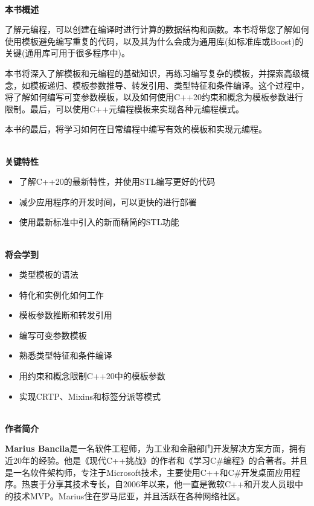 \documentclass[11pt,a4paper,UTF8]{book}
\begin{document}
\begin{sloppypar}
		\hspace*{\fill} \\ %
		\noindent\textbf{本书概述}
		
		了解元编程，可以创建在编译时进行计算的数据结构和函数。本书将带您了解如何使用模板避免编写重复的代码，以及其为什么会成为通用库(如标准库或Boost)的关键(通用库可用于很多程序中)。
		
		本书将深入了解模板和元编程的基础知识，再练习编写复杂的模板，并探索高级概念，如模板递归、模板参数推导、转发引用、类型特征和条件编译。这个过程中，将了解如何编写可变参数模板，以及如何使用C++20约束和概念为模板参数进行限制。最后，可以使用C++元编程模板来实现各种元编程模式。
		
		本书的最后，将学习如何在日常编程中编写有效的模板和实现元编程。
		
		\hspace*{\fill} \\ %
		\noindent\textbf{关键特性}
		\begin{itemize}
			\item 了解C++20的最新特性，并使用STL编写更好的代码
			\item 减少应用程序的开发时间，可以更快的进行部署
			\item 使用最新标准中引入的新而精简的STL功能
		\end{itemize}
		
		\hspace*{\fill} \\ %
		\noindent\textbf{将会学到}
		\begin{itemize}
			\item 类型模板的语法
			\item 特化和实例化如何工作
			\item 模板参数推断和转发引用
			\item 编写可变参数模板
			\item 熟悉类型特征和条件编译
			\item 用约束和概念限制C++20中的模板参数
			\item 实现CRTP、Mixins和标签分派等模式
		\end{itemize}
		
		\hspace*{\fill} \\ %
		\noindent\textbf{作者简介}
		
		\textbf{Marius Bancila}是一名软件工程师，为工业和金融部门开发解决方案方面，拥有近20年的经验。他是《现代C++挑战》的作者和《学习C\#编程》的合著者。并且是一名软件架构师，专注于Microsoft技术，主要使用C++和C\#开发桌面应用程序。热衷于分享其技术专长，自2006年以来，他一直是微软C++和开发人员眼中的技术MVP。Marius住在罗马尼亚，并且活跃在各种网络社区。
		

\end{sloppypar}
\end{document}

